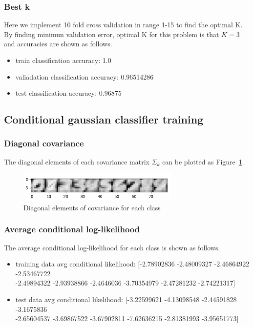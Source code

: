 \documentclass[a4paper]{article}
\begin{document}
\subsubsection{Best k}

Here we implement 10 fold cross validation in range 1-15 to find the optimal K. By finding minimun validation error, optimal K for this problem is that $K=3$ and accuracies are shown as follows.

\begin{itemize}
    \item train classification accuracy: 1.0
    \item valiadation classification accuracy: 0.96514286
    \item test classification accuracy: 0.96875
\end{itemize}

\subsection{Conditional gaussian classifier training}

\subsubsection{Diagonal covariance}

The diagonal elements of each covariance matrix $\Sigma_k$ can be plotted as Figure~\ref{fig: Diagomal_covariance}.

\begin{figure}[htbp]
\centering
\includegraphics[width = 8cm]{Diagomal_covariance}
\caption{Diagonal elements of covariance for each class}
\label{fig: Diagomal_covariance}
\end{figure}

\subsubsection{Average conditional log-likelihood}

The average conditional log-likelihood for each class is shown as follows.

\begin{itemize}
    \item training data avg conditional likelihood: [-2.78902836 -2.48009327 -2.46864922 -2.53467722\\-2.49894322 -2.93938866
 -2.4646036  -3.70354979 -2.47281232 -2.74221317]
    \item test data avg conditional likelihood: [-3.22599621 -4.13098548 -2.44591828 -3.1675836\\-2.65604537 -3.69867522
 -3.67902811 -7.62636215 -2.81381993 -3.95651773]
\end{itemize}
\end{document}

